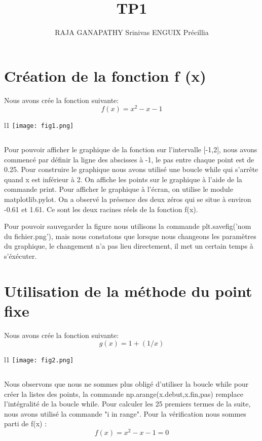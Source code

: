 \documentclass{article}
\title{TP1}
\author{RAJA GANAPATHY Srinivas ENGUIX Précillia}
\begin{document}
\maketitle
        
\section{Création de la fonction f (x)}


        Nous avons crée la fonction suivante:
$$f(x) = x^2 - x - 1$$

\begin{wrapfigure}{l}{1\textwidth}
        \centering
        \texttt{[image: fig1.png]}
        $$ $$
\end{wrapfigure}

$$ $$
$$ $$
$$ $$
$$ $$
$$ $$
$$ $$
$$ $$
$$ $$
$$ $$
$$ $$
$$ $$
$$ $$

Pour pouvoir afficher le graphique de la fonction sur l'intervalle [-1,2], nous avons commencé par définir la ligne des abscisses à -1, le pas entre chaque point est de 0.25.
Pour construire le graphique nous avons utilisé une boucle while qui s'arrête quand x est inférieur à 2.
On affiche les points sur le graphique à l'aide de la commande print.
Pour afficher le graphique à l'écran, on utilise le module matplotlib.pylot.
On a observé la présence des deux zéros qui se situe à environ -0.61 et 1.61.
Ce sont les deux racines réels de la fonction f(x).

Pour pouvoir sauvegarder la figure nous utilisons la commande plt.savefig('nom du fichier.png'), mais nous constatons que lorsque nous changeons les paramètres du graphique, le changement n'a pas lieu directement, il met un certain temps à s'éxécuter.

\section{Utilisation de la méthode du point fixe}

Nous avons crée la fonction suivante:
$$g(x)= 1 + ( 1 / x )$$

\begin{wrapfigure}{l}{1\textwidth}
        \centering
        \texttt{[image: fig2.png]}
        $$ $$
\end{wrapfigure}

$$ $$
$$ $$
$$ $$
$$ $$
$$ $$
$$ $$
$$ $$
$$ $$
$$ $$
$$ $$
$$ $$
$$ $$


Nous observons que nous ne sommes plus obligé d'utiliser la boucle while pour créer la listes des points, la commande np.arange(x.debut,x.fin,pas) remplace l'intégralité de la boucle while.
Pour calculer les 25 premiers termes de la suite, nous avons utilisé la commande "i in range".
Pour la vérification nous sommes parti de f(x) :
$$f(x) = x^2 - x - 1 = 0 $$
\end{document}
